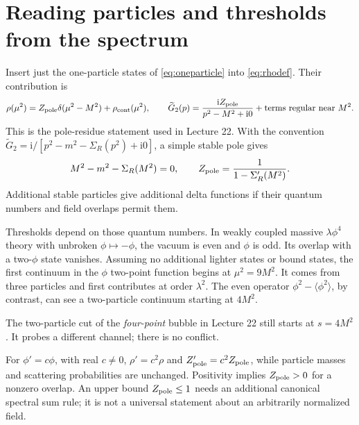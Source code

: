 \documentclass[11pt]{article}
\newcommand{\ii}{\mathrm i}
\newcommand{\module}[1]{\clearpage\section{#1}}
\newcommand{\Zp}{Z_{\rm pole}}
\begin{document}
\module{Reading particles and thresholds from the spectrum}
Insert just the one-particle states of \eqref{eq:oneparticle} into
\eqref{eq:rhodef}. Their contribution is
\begin{equation}
 \rho(\mu^2)=\Zp\delta(\mu^2-M^2)+\rho_{\rm cont}(\mu^2),\qquad
 \widetilde G_2(p)=\frac{\ii\Zp}{p^2-M^2+\ii0}
 +\hbox{terms regular near }M^2.
 \label{eq:pole}
\end{equation}
This is the pole-residue statement used in Lecture 22. With the convention
\(\widetilde G_2=\ii/[p^2-m^2-\Sigma_R(p^2)+\ii0]\), a simple stable pole gives
\begin{equation}
 M^2-m^2-\Sigma_R(M^2)=0,\qquad
 \Zp=\frac{1}{1-\Sigma_R'(M^2)}.
\end{equation}
Additional stable particles give additional delta functions if their
quantum numbers and field overlaps permit them.

Thresholds depend on those quantum numbers. In weakly coupled massive
\(\lambda\phi^4\) theory with unbroken \(\phi\mapsto-\phi\), the vacuum is
even and \(\phi\) is odd. Its overlap with a two-\(\phi\) state vanishes.
Assuming no additional lighter states or bound states, the first continuum
in the \(\phi\) two-point function begins at \(\mu^2=9M^2\). It comes from
three particles and first contributes at order \(\lambda^2\).
The even operator \(\phi^2-\langle\phi^2\rangle\), by contrast, can see a
two-particle continuum starting at \(4M^2\).

\begin{center}
\end{center}
\smallskip
The two-particle cut of the \emph{four-point} bubble in Lecture 22 still
starts at \(s=4M^2\). It probes a different channel; there is no conflict.

\begin{remarkbox}
For \(\phi'=c\phi\), with real \(c\ne0\), \(\rho'=c^2\rho\) and
\(Z'_{\rm pole}=c^2\Zp\), while particle masses and scattering probabilities
are unchanged. Positivity implies \(\Zp>0\) for a nonzero overlap.
An upper bound \(\Zp\leq1\) needs an additional canonical spectral sum rule;
it is not a universal statement about an arbitrarily normalized field.
\end{remarkbox}
\end{document}
